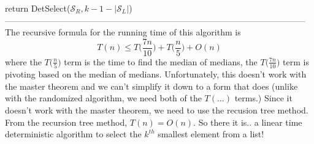 \documentclass{article}
\newcommand{\ds}{\displaystyle}
\begin{document}
	\hspace*{21mm} return DetSelect($\mathcal{S}_R, k-1-|\mathcal{S}_L|$)\\
---------------------------------------------------------------------------------------------------------\\
The recursive formula for the running time of this algorithm is
\[T(n) \leq T\bigg(\frac{7n}{10}\bigg) + T\bigg(\frac{n}{5}\bigg) + O(n)\]
where the $\ds T\bigg(\frac{n}{5}\bigg)$ term is the time to find the median of medians, the $\ds T\bigg(\frac{7n}{10}\bigg)$ term is pivoting based on the median of medians. Unfortunately, this doesn't work with the master theorem and we can't simplify it down to a form that does (unlike with the randomized algorithm, we need both of the $T(\dots)$ terms.) Since it doesn't work with the master theorem, we need to use the recusion tree method. From the recursion tree method, $T(n) = O(n)$. So there it is.. a linear time deterministic algorithm to select the $k^{th}$ smallest element from a list!
\end{document}
